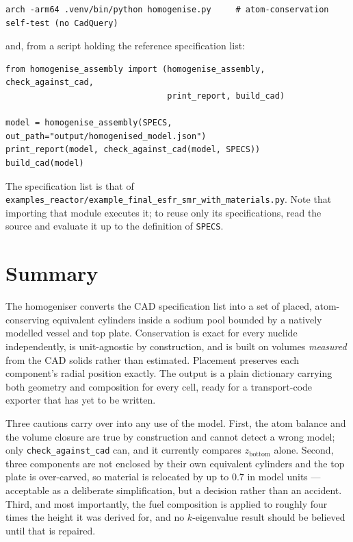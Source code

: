 \documentclass[9pt,a4paper]{extarticle}
\newcommand{\code}[1]{\texttt{\small #1}}
\newcommand{\file}[1]{\texttt{\small #1}}
\begin{document}
\begin{lstlisting}
arch -arm64 .venv/bin/python homogenise.py     # atom-conservation self-test (no CadQuery)
\end{lstlisting}

\noindent
and, from a script holding the reference specification list:

\begin{lstlisting}[style=py]
from homogenise_assembly import (homogenise_assembly, check_against_cad,
                                 print_report, build_cad)

model = homogenise_assembly(SPECS, out_path="output/homogenised_model.json")
print_report(model, check_against_cad(model, SPECS))
build_cad(model)
\end{lstlisting}

\noindent
The specification list is that of
\file{examples\_reactor/example\_final\_esfr\_smr\_with\_materials.py}. Note that
importing that module executes it; to reuse only its specifications, read the
source and evaluate it up to the definition of \code{SPECS}.

\section{Summary}

The homogeniser converts the CAD specification list into a set of placed,
atom-conserving equivalent cylinders inside a sodium pool bounded by a natively
modelled vessel and top plate. Conservation is exact for every nuclide
independently, is unit-agnostic by construction, and is built on volumes
\emph{measured} from the CAD solids rather than estimated. Placement preserves
each component's radial position exactly. The output is a plain dictionary
carrying both geometry and composition for every cell, ready for a transport-code
exporter that has yet to be written.

Three cautions carry over into any use of the model. First, the atom balance and
the volume closure are true by construction and cannot detect a wrong model; only
\code{check\_against\_cad} can, and it currently compares $z_{\mathrm{bottom}}$
alone. Second, three components are not enclosed by their own equivalent
cylinders and the top plate is over-carved, so material is relocated by up to
$0.7$ in model units --- acceptable as a deliberate simplification, but a
decision rather than an accident. Third, and most importantly, the fuel
composition is applied to roughly four times the height it was derived for, and
no $k$-eigenvalue result should be believed until that is repaired.
\end{document}
